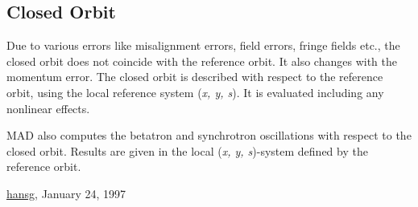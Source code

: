 




\subsection{Closed Orbit}

 Due to various errors like misalignment errors, field errors, fringe fields etc., the closed orbit does not coincide with the reference orbit. It also changes with the momentum error. The closed orbit is described with respect to the reference orbit, using the local reference system (\textit{x, y, s}). It is evaluated including any nonlinear effects. 

 MAD also computes the betatron and synchrotron oscillations with respect to the closed orbit. Results are given in the local (\textit{x, y, s})-system defined by the reference orbit. 

\href{http://www.cern.ch/Hans.Grote/hansg_sign.html}{hansg}, January 24, 1997 


